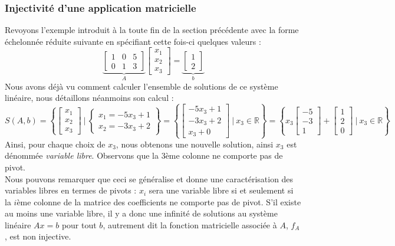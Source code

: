 \documentclass{article}
\newcommand{\R}{\mathbb{R}}
\begin{document}
\subsubsection{Injectivité d'une application matricielle}
\noindent Revoyons l'exemple introduit à la toute fin de la section précédente avec la forme échelonnée réduite suivante en spécifiant cette fois-ci quelques valeurs :
$$\underbrace{\begin{bmatrix}
1 & 0 & 5 \\
0 & 1 & 3
\end{bmatrix}}_{A} \begin{bmatrix}
x_1 \\ x_2 \\ x_3
\end{bmatrix} = \underbrace{\begin{bmatrix}
1 \\ 2
\end{bmatrix}}_{b}
$$ 
Nous avons déjà vu comment calculer l'ensemble de solutions de ce système linéaire, nous détaillons néanmoins son calcul :
$$S(A,b) = \left\{\begin{bmatrix}
x_1 \\ x_2 \\ x_3
\end{bmatrix} \ | \ \begin{cases} 
x_1 = -5x_3 + 1 \\
x_2 = -3x_3 + 2
\end{cases} \right\} = \left\{\begin{bmatrix}
-5x_3 + 1 \\ -3x_3 + 2 \\ x_3 + 0
\end{bmatrix} \ | \ x_3 \in \R \right\} = \left\{x_3\begin{bmatrix}
-5 \\ -3 \\ 1
\end{bmatrix} + \begin{bmatrix}
1 \\ 2 \\ 0
\end{bmatrix} \ | \ x_3 \in \R \right\}
$$
Ainsi, pour chaque choix de $x_3$, nous obtenons une nouvelle solution, ainsi $x_3$ est dénommée \textit{variable libre}. Observons que la $3$ème colonne ne comporte pas de pivot.\\

\noindent Nous pouvons remarquer que ceci se généralise et donne une caractérisation des variables libres en termes de pivots : $x_i$ sera une variable libre si et seulement si la $i$ème colonne de la matrice des coefficients ne comporte pas de pivot. S'il existe au moins une variable libre, il y a donc une infinité de solutions au système linéaire $Ax = b$ pour tout $b$, autrement dit la fonction matricielle associée à $A$, $f_A$, est non injective.\\
\end{document}
